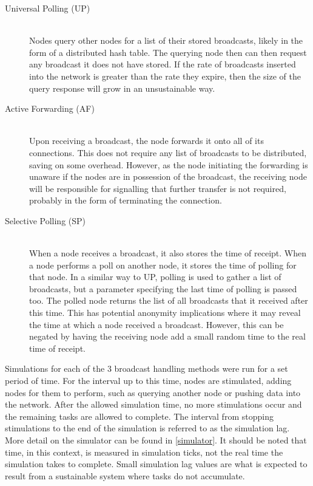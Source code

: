 			\begin{description}
				\item[Universal Polling (UP)] \hfill \\
				Nodes query other nodes for a list of their stored broadcasts, likely in the form of a distributed hash table. The querying node then can then request any broadcast it does not have stored. If the rate of broadcasts inserted into the network is greater than the rate they expire, then the size of the query response will grow in an unsustainable way.
				\item[Active Forwarding (AF)] \hfill \\
				Upon receiving a broadcast, the node forwards it onto all of its connections. This does not require any list of broadcasts to be distributed, saving on some overhead. However, as the node initiating the forwarding is unaware if the nodes are in possession of the broadcast, the receiving node will be responsible for signalling that further transfer is not required, probably in the form of terminating the connection.
				\item[Selective Polling (SP)] \hfill \\
				When a node receives a broadcast, it also stores the time of receipt. When a node performs a poll on another node, it stores the time of polling for that node. In a similar way to UP, polling is used to gather a list of broadcasts, but a parameter specifying the last time of polling is passed too. The polled node returns the list of all broadcasts that it received after this time. This has potential anonymity implications where it may reveal the time at which a node received a broadcast. However, this can be negated by having the receiving node add a small random time to the real time of receipt.
			\end{description}
			
			Simulations for each of the 3 broadcast handling methods were run for a set period of time. For the interval up to this time, nodes are stimulated, adding nodes for them to perform, such as querying another node or pushing data into the network. After the allowed simulation time, no more stimulations occur and the remaining tasks are allowed to complete. The interval from stopping stimulations to the end of the simulation is referred to as the simulation lag. More detail on the simulator can be found in \ref{simulator}.  It should be noted that time, in this context, is measured in simulation ticks, not the real time the simulation takes to complete. Small simulation lag values are what is expected to result from a sustainable system where tasks do not accumulate.
			
